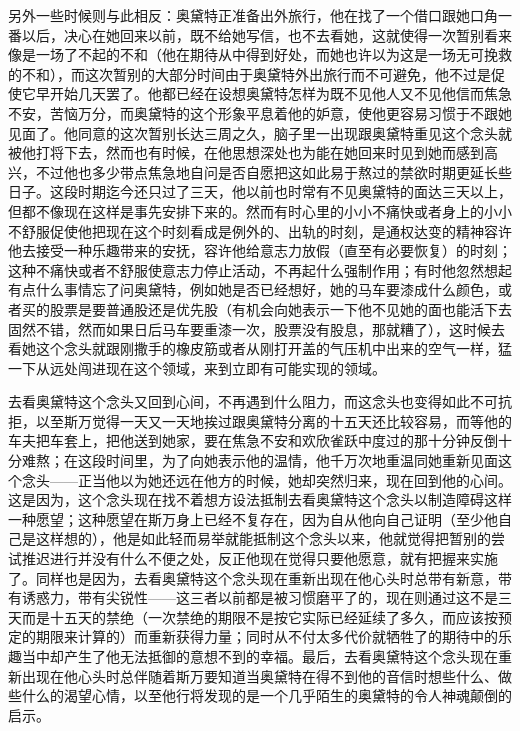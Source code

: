 \par 另外一些时候则与此相反：奥黛特正准备出外旅行，他在找了一个借口跟她口角一番以后，决心在她回来以前，既不给她写信，也不去看她，这就使得一次暂别看来像是一场了不起的不和（他在期待从中得到好处，而她也许以为这是一场无可挽救的不和），而这次暂别的大部分时间由于奥黛特外出旅行而不可避免，他不过是促使它早开始几天罢了。他都已经在设想奥黛特怎样为既不见他人又不见他信而焦急不安，苦恼万分，而奥黛特的这个形象平息着他的妒意，使他更容易习惯于不跟她见面了。他同意的这次暂别长达三周之久，脑子里一出现跟奥黛特重见这个念头就被他打将下去，然而也有时候，在他思想深处也为能在她回来时见到她而感到高兴，不过他也多少带点焦急地自问是否自愿把这如此易于熬过的禁欲时期更延长些日子。这段时期迄今还只过了三天，他以前也时常有不见奥黛特的面达三天以上，但都不像现在这样是事先安排下来的。然而有时心里的小小不痛快或者身上的小小不舒服促使他把现在这个时刻看成是例外的、出轨的时刻，是通权达变的精神容许他去接受一种乐趣带来的安抚，容许他给意志力放假（直至有必要恢复）的时刻；这种不痛快或者不舒服使意志力停止活动，不再起什么强制作用；有时他忽然想起有点什么事情忘了问奥黛特，例如她是否已经想好，她的马车要漆成什么颜色，或者买的股票是要普通股还是优先股（有机会向她表示一下他不见她的面也能活下去固然不错，然而如果日后马车要重漆一次，股票没有股息，那就糟了），这时候去看她这个念头就跟刚撒手的橡皮筋或者从刚打开盖的气压机中出来的空气一样，猛一下从远处闯进现在这个领域，来到立即有可能实现的领域。
\par 去看奥黛特这个念头又回到心间，不再遇到什么阻力，而这念头也变得如此不可抗拒，以至斯万觉得一天又一天地挨过跟奥黛特分离的十五天还比较容易，而等他的车夫把车套上，把他送到她家，要在焦急不安和欢欣雀跃中度过的那十分钟反倒十分难熬；在这段时间里，为了向她表示他的温情，他千万次地重温同她重新见面这个念头——正当他以为她还远在他方的时候，她却突然归来，现在回到他的心间。这是因为，这个念头现在找不着想方设法抵制去看奥黛特这个念头以制造障碍这样一种愿望；这种愿望在斯万身上已经不复存在，因为自从他向自己证明（至少他自己是这样想的），他是如此轻而易举就能抵制这个念头以来，他就觉得把暂别的尝试推迟进行并没有什么不便之处，反正他现在觉得只要他愿意，就有把握来实施了。同样也是因为，去看奥黛特这个念头现在重新出现在他心头时总带有新意，带有诱惑力，带有尖锐性——这三者以前都是被习惯磨平了的，现在则通过这不是三天而是十五天的禁绝（一次禁绝的期限不是按它实际已经延续了多久，而应该按预定的期限来计算的）而重新获得力量；同时从不付太多代价就牺牲了的期待中的乐趣当中却产生了他无法抵御的意想不到的幸福。最后，去看奥黛特这个念头现在重新出现在他心头时总伴随着斯万要知道当奥黛特在得不到他的音信时想些什么、做些什么的渴望心情，以至他行将发现的是一个几乎陌生的奥黛特的令人神魂颠倒的启示。
